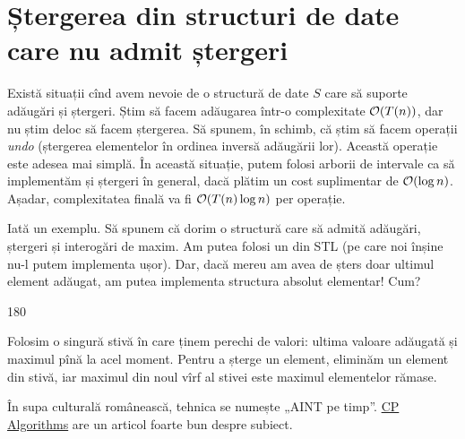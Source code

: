 \documentclass[../main.tex]{subfiles}
\begin{document}
\chapter{Ștergerea din structuri de date care nu admit ștergeri}

Există situații cînd avem nevoie de o structură de date $S$ care să suporte adăugări și ștergeri. Știm să facem adăugarea într-o complexitate $\mathcal{O}(T(n))$, dar nu știm deloc să facem ștergerea. Să spunem, în schimb, că știm să facem operații \textit{undo} (ștergerea elementelor în ordinea inversă adăugării lor). Această operație este adesea mai simplă. În această situație, putem folosi arborii de intervale ca să implementăm și ștergeri în general, dacă plătim un cost suplimentar de $\mathcal{O}(\log n)$. Așadar, complexitatea finală va fi $\mathcal{O}(T(n) \log n)$ per operație.

Iată un exemplu. Să spunem că dorim o structură care să admită adăugări, ștergeri și interogări de maxim. Am putea folosi un  din STL (pe care noi înșine nu-l putem implementa ușor). Dar, dacă mereu am avea de șters doar ultimul element adăugat, am putea implementa structura absolut elementar! Cum?

\begin{turn}{180}
  \begin{minipage}{\linewidth}
    Folosim o singură stivă în care ținem perechi de valori: ultima valoare adăugată și maximul pînă la acel moment. Pentru a șterge un element, eliminăm un element din stivă, iar maximul din noul vîrf al stivei este maximul elementelor rămase.
  \end{minipage}
\end{turn}

În supa culturală românească, tehnica se numește „AINT pe timp”. \href{https://cp-algorithms.com/data_structures/deleting_in_log_n.html}{CP Algorithms} are un articol foarte bun despre subiect.
\end{document}
